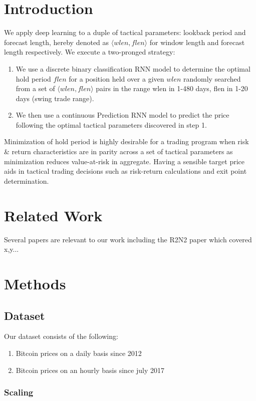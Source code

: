 \documentclass{article}
\begin{document}
\begin{multicols}{2}
\section{Introduction}
 We apply deep learning to a duple of tactical parameters: lookback period and forecast length, hereby denoted as $\langle wlen, flen \rangle$ for window length and forecast length respectively. We execute a two-pronged strategy:
\begin{enumerate}
\item We use a discrete binary classification RNN model to determine the optimal hold period $flen$ for a position held over a given $wlen$ randomly searched from a set of $\langle wlen, flen \rangle$ pairs in the range wlen in 1-480 days, flen in 1-20 days (swing trade range).
\item We then use a continuous Prediction RNN model to predict the price following the optimal tactical parameters discovered in step 1.
\end{enumerate}
Minimization of hold period is highly desirable for a trading program when risk \& return characteristics are in parity across a set of tactical parameters as minimization reduces value-at-risk in aggregate. Having a sensible target price aids in tactical trading decisions such as risk-return calculations and exit point determination.


\section{Related Work}
Several papers are relevant to our work including the R2N2 paper \cite{1_website}  which covered x,y...

\section{Methods}
\subsection{Dataset}
Our dataset consists of the following:
\begin{enumerate}
    \item Bitcoin prices on a daily basis since 2012
    \item Bitcoin prices on an hourly basis since july 2017
\end{enumerate}


\subsubsection{Scaling}

\end{multicols}
\end{document}
